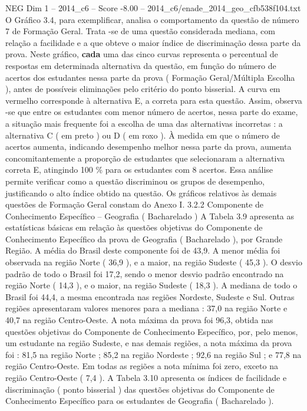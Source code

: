 \begin{textsample}{NEG Dim 1 – 2014\_c6 – Score -8.00 – 2014\_c6/enade\_2014\_geo\_cfb538f104.txt}
O Gráfico 3.4, para exemplificar, analisa o comportamento da questão de número 7 de Formação Geral.
Trata -se de uma questão considerada mediana, com relação a facilidade e a que obteve o maior índice de discriminação dessa parte da prova.
Neste gráfico, \textbf{cada} uma das cinco curvas representa o percentual de respostas em determinada alternativa da questão, em função do número de acertos dos estudantes nessa parte da prova ( Formação Geral/Múltipla Escolha ), antes de possíveis eliminações pelo critério do ponto bisserial.
A curva em vermelho corresponde à alternativa E, a correta para esta questão.
Assim, observa -se que entre os estudantes com menor número de acertos, nessa parte do exame, a situação mais frequente foi a escolha de uma das alternativas incorretas : a alternativa C ( em preto ) ou D ( em roxo ).
À medida em que o número de acertos aumenta, indicando desempenho melhor nessa parte da prova, aumenta concomitantemente a proporção de estudantes que selecionaram a alternativa correta E, atingindo 100 \% para os estudantes com 8 acertos.
Essa análise permite verificar como a questão discriminou os grupos de desempenho, justificando o alto índice obtido na questão.
Os gráficos relativos às demais questões de Formação Geral constam do Anexo I. 3.2.2 Componente de Conhecimento Específico – Geografia ( Bacharelado ) A Tabela 3.9 apresenta as estatísticas básicas em relação às questões objetivas do Componente de Conhecimento Específico da prova de Geografia ( Bacharelado ), por Grande Região.
A média do Brasil deste componente foi de 43,9.
A menor média foi observada na região Norte ( 36,9 ), e a maior, na região Sudeste ( 45,3 ).
O desvio padrão de todo o Brasil foi 17,2, sendo o menor desvio padrão encontrado na região Norte ( 14,3 ), e o maior, na região Sudeste ( 18,3 ).
A mediana de todo o Brasil foi 44,4, a mesma encontrada nas regiões Nordeste, Sudeste e Sul.
Outras regiões apresentaram valores menores para a mediana : 37,0 na região Norte e 40,7 na região Centro-Oeste.
A nota máxima da prova foi 96,3, obtida nas questões objetivas do Componente de Conhecimento Específico, por, pelo menos, um estudante na região Sudeste, e nas demais regiões, a nota máxima da prova foi : 81,5 na região Norte ; 85,2 na região Nordeste ; 92,6 na região Sul ; e 77,8 na região Centro-Oeste.
Em todas as regiões a nota mínima foi zero, exceto na região Centro-Oeste ( 7,4 ).
A Tabela 3.10 apresenta os índices de facilidade e discriminação ( ponto bisserial ) das questões objetivas do Componente de Conhecimento Específico para os estudantes de Geografia ( Bacharelado ).

\end{textsample}
